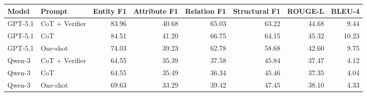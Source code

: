\begin{tabular}{llrrrrrr}
\toprule
Model & Prompt & Entity F1 & Attribute F1 & Relation F1 & Structural F1 & ROUGE-L & BLEU-4 \\
\midrule
GPT-5.1 & CoT + Verifier & 83.96 & 40.68 & 65.03 & 63.22 & 44.68 & 9.44 \\
GPT-5.1 & CoT & 84.51 & 41.20 & 66.75 & 64.15 & 45.32 & 10.23 \\
GPT-5.1 & One-shot & 74.03 & 39.23 & 62.78 & 58.68 & 42.60 & 9.75 \\
Qwen-3 & CoT + Verifier & 64.55 & 35.39 & 37.58 & 45.84 & 37.47 & 4.12 \\
Qwen-3 & CoT & 64.55 & 35.49 & 36.34 & 45.46 & 37.35 & 4.04 \\
Qwen-3 & One-shot & 69.63 & 33.29 & 39.42 & 47.45 & 38.10 & 4.33 \\
\bottomrule
\end{tabular}
